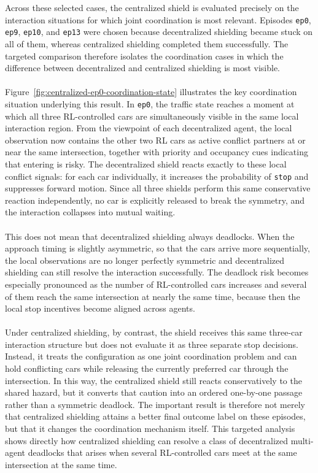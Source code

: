 Across these selected cases, the centralized shield is evaluated precisely on the interaction situations for which joint coordination is most relevant. Episodes \texttt{ep0}, \texttt{ep9}, \texttt{ep10}, and \texttt{ep13} were chosen because decentralized shielding became stuck on all of them, whereas centralized shielding completed them successfully. The targeted comparison therefore isolates the coordination cases in which the difference between decentralized and centralized shielding is most visible.
\\
\\
Figure~\ref{fig:centralized-ep0-coordination-state} illustrates the key coordination situation underlying this result. In \texttt{ep0}, the traffic state reaches a moment at which all three RL-controlled cars are simultaneously visible in the same local interaction region. From the viewpoint of each decentralized agent, the local observation now contains the other two RL cars as active conflict partners at or near the same intersection, together with priority and occupancy cues indicating that entering is risky. The decentralized shield reacts exactly to these local conflict signals: for each car individually, it increases the probability of \texttt{stop} and suppresses forward motion. Since all three shields perform this same conservative reaction independently, no car is explicitly released to break the symmetry, and the interaction collapses into mutual waiting.
\\
\\
This does not mean that decentralized shielding always deadlocks. When the approach timing is slightly asymmetric, so that the cars arrive more sequentially, the local observations are no longer perfectly symmetric and decentralized shielding can still resolve the interaction successfully. The deadlock risk becomes especially pronounced as the number of RL-controlled cars increases and several of them reach the same intersection at nearly the same time, because then the local stop incentives become aligned across agents.
\\
\\
Under centralized shielding, by contrast, the shield receives this same three-car interaction structure but does not evaluate it as three separate stop decisions. Instead, it treats the configuration as one joint coordination problem and can hold conflicting cars while releasing the currently preferred car through the intersection. In this way, the centralized shield still reacts conservatively to the shared hazard, but it converts that caution into an ordered one-by-one passage rather than a symmetric deadlock. The important result is therefore not merely that centralized shielding attains a better final outcome label on these episodes, but that it changes the coordination mechanism itself. This targeted analysis shows directly how centralized shielding can resolve a class of decentralized multi-agent deadlocks that arises when several RL-controlled cars meet at the same intersection at the same time.

